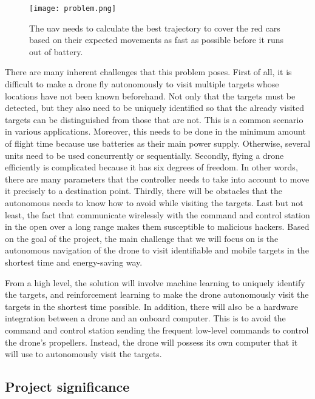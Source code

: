 \documentclass[../main.tex]{subfiles}
\begin{document}
\begin{figure}[tb] 
    \centering
    \texttt{[image: problem.png]} 
    \caption{The \gls{uav} needs to calculate 
    the best trajectory to cover the red cars
    based on their expected movements
    as fast as possible before it runs out of battery.} 
    \label{fig:problem} 
\end{figure}

There are many inherent challenges that this problem
poses. First of all, it is difficult to make a drone
fly autonomously to visit multiple targets whose locations
have not been known beforehand. 
Not only that the targets must be detected, 
but they also need to be uniquely
identified so that the already visited targets
can be distinguished from those that are not.
This is a common scenario in various applications. 
Moreover, this needs to be done in the minimum
amount of flight time because \uavs use batteries
as their main power supply.
Otherwise, several units need to be used concurrently
or sequentially.
Secondly, flying a drone efficiently is complicated 
because it has six degrees of freedom. In other words, 
there are many parameters that the controller needs to 
take into account to move 
it precisely to a destination point. 
Thirdly, there will be obstacles that the autonomous \uav
needs to know how to avoid while visiting the targets.
Last but not least, the fact that \uavs communicate wirelessly
with the command and control station in the open 
over a long range makes them susceptible
to malicious hackers.
Based on the goal of the project, the main challenge 
that we will focus on is the autonomous navigation
of the drone to visit identifiable and mobile targets in the shortest
time and energy-saving way.

From a high level, the solution will involve machine learning
to uniquely identify the targets, and reinforcement learning
to make the drone autonomously visit the targets in the
shortest time possible. In addition, there will also be
a hardware integration between a drone and an onboard
computer. This is to avoid the command and control
station sending the frequent low-level commands to control
the drone's propellers. 
Instead, the drone
will possess its own computer that it will use to 
autonomously visit the targets.

\subsection{Project significance}
\end{document}
